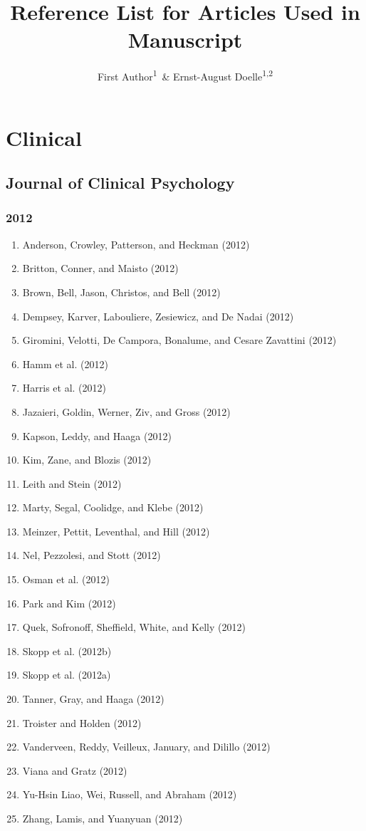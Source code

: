 \documentclass[english,man]{apa6}
\title{Reference List for Articles Used in Manuscript}
\author{First Author\textsuperscript{1}~\& Ernst-August Doelle\textsuperscript{1,2}}
\affiliation{
    \vspace{0.5cm}
          \textsuperscript{1} Wilhelm-Wundt-University\\
          \textsuperscript{2} Konstanz Business School  }
\providecommand{\tightlist}{%
  \setlength{\itemsep}{0pt}\setlength{\parskip}{0pt}}
\theoremstyle{definition}
\theoremstyle{definition}
\theoremstyle{definition}
\theoremstyle{remark}
\begin{document}
\maketitle

\setcounter{secnumdepth}{0}



\section{Clinical}\label{clinical}

\subsection{Journal of Clinical
Psychology}\label{journal-of-clinical-psychology}

\subsubsection{2012}\label{section}

\begin{enumerate}
\def\labelenumi{\arabic{enumi})}
\tightlist
\item
  Anderson, Crowley, Patterson, and Heckman (2012)
\item
  Britton, Conner, and Maisto (2012)
\item
  Brown, Bell, Jason, Christos, and Bell (2012)
\item
  Dempsey, Karver, Labouliere, Zesiewicz, and De Nadai (2012)
\item
  Giromini, Velotti, De Campora, Bonalume, and Cesare Zavattini (2012)
\item
  Hamm et al. (2012)
\item
  Harris et al. (2012)
\item
  Jazaieri, Goldin, Werner, Ziv, and Gross (2012)
\item
  Kapson, Leddy, and Haaga (2012)
\item
  Kim, Zane, and Blozis (2012)
\item
  Leith and Stein (2012)
\item
  Marty, Segal, Coolidge, and Klebe (2012)
\item
  Meinzer, Pettit, Leventhal, and Hill (2012)
\item
  Nel, Pezzolesi, and Stott (2012)
\item
  Osman et al. (2012)
\item
  Park and Kim (2012)
\item
  Quek, Sofronoff, Sheffield, White, and Kelly (2012)
\item
  Skopp et al. (2012b)
\item
  Skopp et al. (2012a)
\item
  Tanner, Gray, and Haaga (2012)
\item
  Troister and Holden (2012)
\item
  Vanderveen, Reddy, Veilleux, January, and Dilillo (2012)
\item
  Viana and Gratz (2012)
\item
  Yu-Hsin Liao, Wei, Russell, and Abraham (2012)
\item
  Zhang, Lamis, and Yuanyuan (2012)
\end{enumerate}
\end{document}
